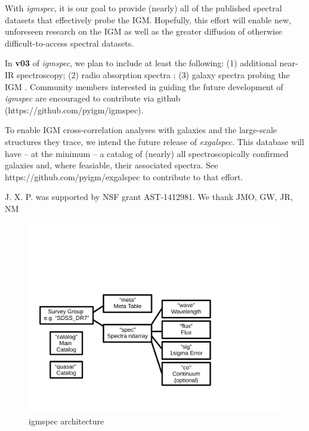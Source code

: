 \documentclass[12pt,preprint]{aastex}
\begin{document}
With {\it igmspec}, it is our goal to provide (nearly)
all of the published spectral datasets that effectively
probe the IGM.  Hopefully, this effort will
enable new, unforeseen research on the IGM as well
as the greater diffusion of otherwise difficult-to-access spectral
datasets.  

In {\bf v03} of
{\it igmspec}, we plan to include at least the following:
(1) additional near-IR spectroscopy;
(2) radio absorption spectra \citep[e.g. 21\,cm][]{kanekar1X};
(3) galaxy spectra probing the IGM \citep[e.g.][]{rubin+16}.
Community members interested in guiding the future development
of {\it igmspec} are encouraged to contribute via github
(https://github.com/pyigm/igmspec).

To enable IGM cross-correlation analyses with galaxies
and the large-scale structures they trace,
we intend the future release of {\it exgalspec}.
This database will have -- at
the minimum -- a catalog of (nearly) all spectroscopically
confirmed galaxies and, where feasiable, their associated
spectra.  See https://github.com/pyigm/exgalspec
to contribute to that effort.


\acknowledgments

J. X. P. was supported by NSF grant AST-1412981.
We thank JMO, GW, JR, NM


%
%

%
%


\begin{figure}
\includegraphics[width=6in]{architecture_v02.pdf}
\caption{igmspec architecture
}
\label{fig:arch}
\end{figure}
\end{document}
